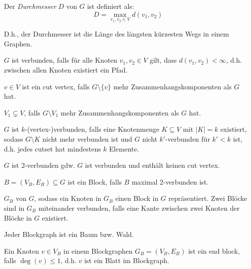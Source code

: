 \begin{definition}[Durchmesser]
    Der \textit{Durchmesser} $ D $ von $ G $ ist definiert als:
    \begin{equation*}
        D = \max_{v_1, v_2 \in V} d(v_1, v_2)
    \end{equation*}

    D.h., der Durchmesser ist die Länge des längsten kürzesten Wegs in einem Graphen.
\end{definition}

\begin{definition}[Verbundenheit]
    $ G $ ist verbunden, falls für alle Knoten $ v_1, v_2 \in V $ gilt, dass $ d(v_1, v_2) < \infty $, d.h. zwischen allen Knoten existiert ein Pfad.
\end{definition}

\begin{definition}
    $ v \in V $ ist ein cut vertex, falls $ G \setminus \{ v \} $ mehr Zusammenhangskomponenten als $ G $ hat.
\end{definition}

\begin{definition}[Cutset]
    $ V_1 \subsetneq V $, falls $ G \setminus V_1 $ mehr Zusammenhangskomponenten als $ G $ hat.
\end{definition}

\begin{definition}
    $ G $ ist $ k $-(vertex-)verbunden, falls eine Knotenmenge $ K \subseteq V $ mit $ |K| = k $ existiert, sodass $ G \setminus K $ nicht mehr verbunden ist und $ G $ nicht $ k' $-verbunden für $ k' < k $ ist, d.h. jedes cutset hat mindestens $ k $ Elemente.
\end{definition}

\begin{proposition}
    $ G $ ist 2-verbunden gdw. $ G $ ist verbunden und enthält keinen cut vertex.
\end{proposition}

\begin{definition}[Block]
    $ B = (V_B, E_B) \subseteq G $ ist ein Block, falls $ B $ maximal 2-verbunden ist.
\end{definition}

\begin{definition}[Blockgraph]
    $ G_B $ von $ G $, sodass ein Knoten in $ G_B $ einen Block in $ G $ repräsentiert.
    Zwei Blöcke sind in $ G_B $ miteinander verbunden, falls eine Kante zwischen zwei Knoten der Blöcke in $ G $ existiert.
\end{definition}

\begin{proposition}
    Jeder Blockgraph ist ein Baum bzw. Wald.
\end{proposition}

\begin{definition}
    Ein Knoten $ v \in V_B $ in einem Blockgraphen $ G_B = (V_B, E_B) $ ist ein end block, falls $ \deg(v) \leq 1 $, d.h. $ v $ ist ein Blatt im Blockgraph.
\end{definition}

